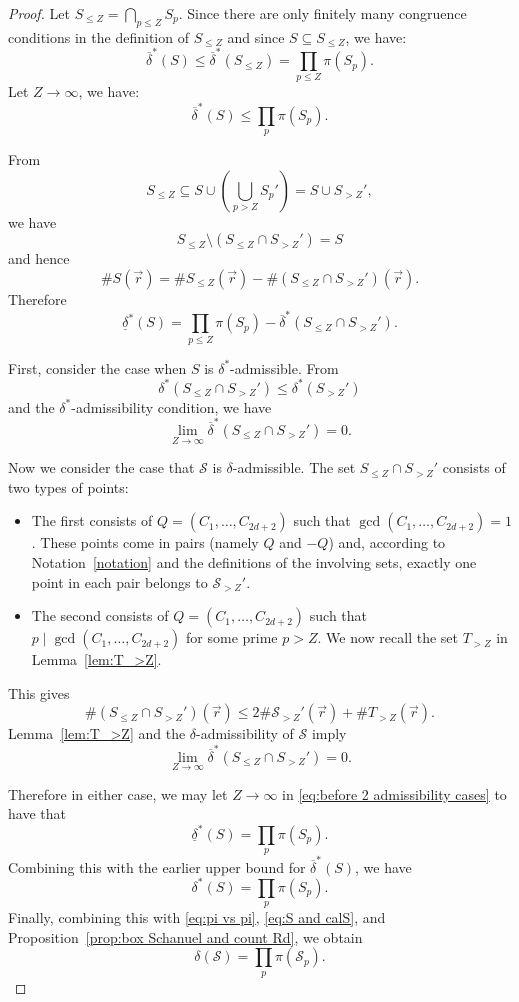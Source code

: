 \documentclass[12pt]{amsart}
\numberwithin{equation}{section}
\begin{document}
\begin{proof}
    Let $S_{\leq Z}=\bigcap_{p\leq Z} S_p$. Since there are only finitely many congruence conditions in the definition of $S_{\leq Z}$ and since $S\subseteq S_{\leq Z}$, we have:
    $$\overline{\delta}^*(S)\leq \overline{\delta}^*(S_{\leq Z})=\prod_{p\leq Z} \pi(S_p).$$
    Let $Z\rightarrow\infty$, we have:
    $$\overline{\delta}^*(S)\leq \prod_p \pi(S_p).$$

    From
    $$S_{\leq Z}\subseteq S\cup\left(\bigcup_{p>Z} S_p'\right)= S\cup S_{>Z}',$$
    we have
    $$S_{\leq Z}\setminus (S_{\leq Z}\cap S_{>Z}')=S$$
    and hence
    $$\# S(\vec{r})= \# S_{\leq Z}(\vec{r})-\# (S_{\leq Z}\cap S_{>Z}')(\vec{r}).$$
    Therefore
    \begin{equation}\label{eq:before 2 admissibility cases}
    \underline{\delta}^*(S)=\prod_{p\leq Z}\pi(S_p)-\overline{\delta}^*(S_{\leq Z}\cap S_{>Z}').
    \end{equation}
    
    First, consider the case when $S$ is $\delta^*$-admissible. From
    $$\delta^*(S_{\leq Z}\cap S_{>Z}')\leq \delta^*(S_{>Z}')$$
    and the $\delta^*$-admissibility condition, we have
    $$\lim_{Z\rightarrow\infty}\overline{\delta}^*(S_{\leq Z}\cap S_{>Z}')=0.$$
    

    Now we consider the case that $\mathcal{S}$ is $\delta$-admissible. The set
    $S_{\leq Z}\cap S_{>Z}'$ consists of two types of points:
    \begin{itemize}
        \item [(1)] The first consists of $Q=(C_1,\ldots,C_{2d+2})$ such that
        $\gcd(C_1,\ldots,C_{2d+2})=1$. These points come in pairs (namely $Q$ and $-Q$) and, according to Notation~\ref{notation} and the definitions of the involving sets, exactly one point in each pair belongs to
        $\mathcal{S}_{>Z}'$.

        \item [(2)] The second consists of $Q=(C_1,\ldots,C_{2d+2})$ such that
        $p\mid \gcd (C_1,\ldots,C_{2d+2})$ for some prime $p>Z$. We now recall the set
        $T_{>Z}$ in Lemma~\ref{lem:T_>Z}.
    \end{itemize}
    This gives
    $$\# (S_{\leq Z}\cap S_{>Z}')(\vec{r})\leq 2\#\mathcal{S}_{>Z}'(\vec{r})+\# T_{>Z}(\vec{r}).$$
    Lemma~\ref{lem:T_>Z} and the $\delta$-admissibility of $\mathcal{S}$ imply
    $$\lim_{Z\rightarrow\infty}\overline{\delta}^*(S_{\leq Z}\cap S_{>Z}')=0.$$

    Therefore in either case, we may let $Z\rightarrow\infty$ in \eqref{eq:before 2 admissibility cases} to have that
    $$\underline{\delta}^*(S)= \prod_{p}\pi(S_p).$$
    Combining this with the earlier upper bound for $\overline{\delta}^*(S)$, we have
    $$\delta^*(S)=\prod_p \pi(S_p).$$
    Finally, combining this with \eqref{eq:pi vs pi}, \eqref{eq:S and calS}, and Proposition~\ref{prop:box Schanuel and count Rd}, we obtain
    $$\delta(\mathcal{S})=\prod_p \pi(\mathcal{S}_p).$$
\end{proof}
\end{document}
